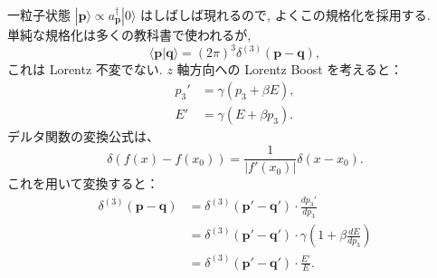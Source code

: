 \documentclass[a4paper,12pt]{article}
\begin{document}
一粒子状態 \( |\mathbf{p}\rangle \propto a^\dagger_{\mathbf{p}} |0\rangle \) はしばしば現れるので, よくこの規格化を採用する.\\
単純な規格化は多くの教科書で使われるが,
\begin{equation*}
\langle \mathbf{p} | \mathbf{q} \rangle = (2\pi)^3 \delta^{(3)}(\mathbf{p} - \mathbf{q}),
\end{equation*}
これは Lorentz 不変でない. $z$ 軸方向への Lorentz Boost を考えると：
\begin{align*}
p_3' &= \gamma (p_3 + \beta E), \\
E' &= \gamma (E + \beta p_3).
\end{align*}
デルタ関数の変換公式は、
\begin{equation}
\delta(f(x) - f(x_0)) = \frac{1}{|f'(x_0)|} \delta(x - x_0). \tag{2.34}
\end{equation}
これを用いて変換すると：
\begin{align*}
\delta^{(3)}(\mathbf{p} - \mathbf{q}) &= \delta^{(3)}(\mathbf{p}' - \mathbf{q}') \cdot \frac{dp_3'}{dp_3} \\
&= \delta^{(3)}(\mathbf{p}' - \mathbf{q}') \cdot \gamma \left(1 + \beta \frac{dE}{dp_3} \right) \\
&= \delta^{(3)}(\mathbf{p}' - \mathbf{q}') \cdot \frac{E'}{E}.
\end{align*}
\end{document}
